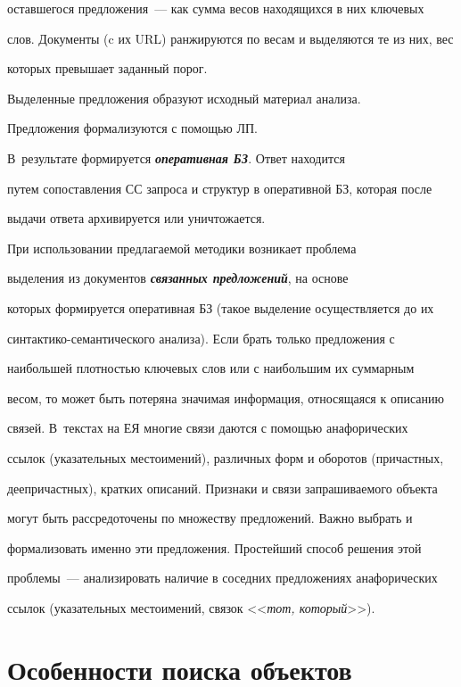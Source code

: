 оставшегося предложения~--- как сумма весов находящихся в них ключевых 


слов. Документы (c их URL) ранжируются по весам и выделяются те из них, вес 


которых превышает заданный порог. 


    


    Выделенные предложения образуют исходный материал анализа. 


Предложения формализуются с помощью ЛП. 


В~результате формируется {\bfseries\textit{оперативная БЗ}}. Ответ находится 


путем сопоставления СС запроса и структур в оперативной БЗ, которая после 


выдачи ответа архивируется или уничтожается. 


    


    При использовании предлагаемой методики возникает проблема 


выделения из документов {\bfseries\textit{связанных предложений}}, на основе 


которых формируется оперативная БЗ (такое выделение осуществляется до их 


синтактико-семантического анализа). Если брать только предложения с 


наибольшей плотностью ключевых слов или с наибольшим их суммарным 


весом, то может быть потеряна значимая информация, относящаяся к описанию 


связей. В~текстах на ЕЯ многие связи даются с помощью анафорических 


ссылок (указательных местоимений), различных форм и оборотов (причастных, 


деепричастных), кратких описаний. Признаки и связи запрашиваемого объекта 


могут быть рассредоточены по множеству предложений. Важно выбрать и 


формализовать именно эти предложения. Простейший способ решения этой 


проблемы~--- анализировать наличие в соседних предложениях анафорических 


ссылок (указательных местоимений, связок <<\textit{тот, который}>>). 


    


\section{Особенности поиска объектов}


